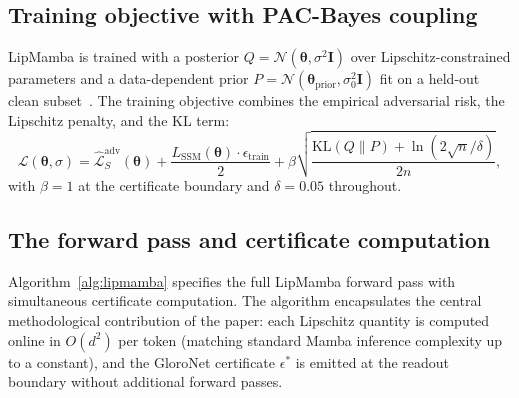 \documentclass[journal,a4paper,10pt]{IEEEtran}
\theoremstyle{definition}
\theoremstyle{remark}
\newcommand{\modelname}{LipMamba}
\newcommand{\Lcal}{\mathcal{L}}
\newcommand{\Ncal}{\mathcal{N}}
\newcommand{\KL}{\mathrm{KL}}
\begin{document}
\subsection{Training objective with PAC-Bayes coupling}
\label{subsec:training}

\modelname{} is trained with a posterior $Q = \Ncal(\bm{\theta}, \sigma^2 \mathbf{I})$ over Lipschitz-constrained parameters and a data-dependent prior $P = \Ncal(\bm{\theta}_{\mathrm{prior}}, \sigma_0^2 \mathbf{I})$ fit on a held-out clean subset~\cite{perezortiz2021tighter}. The training objective combines the empirical adversarial risk, the Lipschitz penalty, and the KL term:
\begin{equation}
    \Lcal(\bm{\theta}, \sigma) = \hat{\Lcal}_S^{\mathrm{adv}}(\bm{\theta}) + \frac{L_{\mathrm{SSM}}(\bm{\theta}) \cdot \epsilon_{\mathrm{train}}}{2} + \beta \sqrt{\frac{\KL(Q \| P) + \ln(2 \sqrt{n}/\delta)}{2 n}},
    \label{eq:objective}
\end{equation}
with $\beta = 1$ at the certificate boundary and $\delta = 0.05$ throughout.

\subsection{The forward pass and certificate computation}
\label{subsec:algorithm}

Algorithm~\ref{alg:lipmamba} specifies the full \modelname{} forward pass with simultaneous certificate computation. The algorithm encapsulates the central methodological contribution of the paper: each Lipschitz quantity is computed online in $O(d^2)$ per token (matching standard Mamba inference complexity up to a constant), and the GloroNet certificate $\epsilon^*$ is emitted at the readout boundary without additional forward passes.
\end{document}

